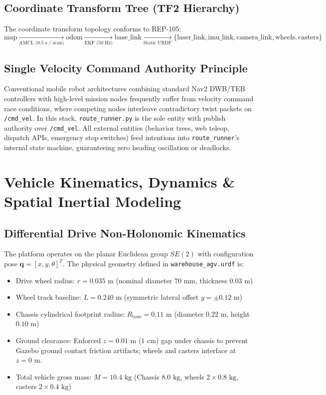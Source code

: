 \documentclass[10pt,a4paper]{article}
\begin{document}
\subsection{Coordinate Transform Tree (TF2 Hierarchy)}
The coordinate transform topology conforms to REP-105:
\begin{equation}
\text{map} \xrightarrow[\text{AMCL (0.5 s / scan)}]{} \text{odom} \xrightarrow[\text{EKF (50 Hz)}]{} \text{base\_link} \xrightarrow[\text{Static URDF}]{} \{\text{laser\_link}, \text{imu\_link}, \text{camera\_link}, \text{wheels}, \text{casters}\}
\end{equation}

\subsection{Single Velocity Command Authority Principle}
Conventional mobile robot architectures combining standard Nav2 DWB/TEB controllers with high-level mission nodes frequently suffer from velocity command race conditions, where competing nodes interleave contradictory twist packets on \texttt{/cmd\_vel}. In this stack, \texttt{route\_runner.py} is the sole entity with publish authority over \texttt{/cmd\_vel}. All external entities (behavior trees, web teleop, dispatch APIs, emergency stop switches) feed intentions into \texttt{route\_runner}'s internal state machine, guaranteeing zero heading oscillation or deadlocks.

\section{Vehicle Kinematics, Dynamics \& Spatial Inertial Modeling}

\subsection{Differential Drive Non-Holonomic Kinematics}
The platform operates on the planar Euclidean group $SE(2)$ with configuration pose $\mathbf{q} = [x, y, \theta]^T$. The physical geometry defined in \texttt{warehouse\_agv.urdf} is:
\begin{itemize}
    \item Drive wheel radius: $r = 0.035\text{ m}$ (nominal diameter $70\text{ mm}$, thickness $0.03\text{ m}$)
    \item Wheel track baseline: $L = 0.240\text{ m}$ (symmetric lateral offset $y = \pm 0.12\text{ m}$)
    \item Chassis cylindrical footprint radius: $R_{\text{base}} = 0.11\text{ m}$ (diameter $0.22\text{ m}$, height $0.10\text{ m}$)
    \item Ground clearance: Enforced $z = 0.01\text{ m}$ ($1\text{ cm}$) gap under chassis to prevent Gazebo ground contact friction artifacts; wheels and casters interface at $z = 0\text{ m}$.
    \item Total vehicle gross mass: $M = 10.4\text{ kg}$ (Chassis $8.0\text{ kg}$, wheels $2 \times 0.8\text{ kg}$, casters $2 \times 0.4\text{ kg}$)
\end{itemize}
\end{document}
